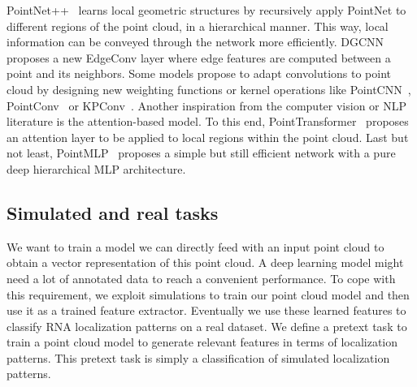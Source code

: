 PointNet++~\cite{Qi_2017} learns local geometric structures by recursively apply PointNet to different regions of the point cloud, in a hierarchical manner.
This way, local information can be conveyed through the network more efficiently.
DGCNN~\cite{Wang_2019} proposes a new EdgeConv layer where edge features are computed between a point and its neighbors.
Some models propose to adapt convolutions to point cloud by designing new weighting functions or kernel operations like PointCNN~\cite{Li_2018}, PointConv~\cite{Wu_2019_CVPR} or KPConv~\cite{Thomas_2019_ICCV}.
Another inspiration from the computer vision or NLP literature is the attention-based model.
To this end, PointTransformer~\cite{Zhao_2021_ICCV} proposes an attention layer to be applied to local regions within the point cloud.
Last but not least, PointMLP~\cite{ma2022rethinking} proposes a simple but still efficient network with a pure deep hierarchical MLP architecture.

\subsection{Simulated and real tasks} \label{subsec:simulation_real_datasets}

We want to train a model we can directly feed with an input point cloud to obtain a vector representation of this point cloud.
A deep learning model might need a lot of annotated data to reach a convenient performance.
To cope with this requirement, we exploit simulations to train our point cloud model and then use it as a trained feature extractor.
Eventually we use these learned features to classify \ac{RNA} localization patterns on a real dataset.
We define a pretext task to train a point cloud model to generate relevant features in terms of localization patterns.
This pretext task is simply a classification of simulated localization patterns.

